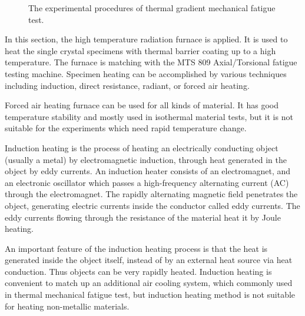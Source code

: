 \begin{figure}[!htp]
\caption{The experimental procedures of thermal gradient mechanical fatigue test.}
\label{Fig:tgmf_code}
\end{figure}

In this section, the high temperature radiation furnace is applied.
It is used to heat the single crystal specimens with thermal barrier coating up to a high temperature.
The furnace is matching with the MTS 809 Axial/Torsional fatigue testing machine.
Specimen heating can be accomplished by various techniques including induction, direct resistance, radiant, or forced air heating.




Forced air heating furnace can be used for all kinds of material. It has good temperature stability and mostly used in isothermal material tests, but it is not suitable for the experiments which need rapid temperature change.

Induction heating is the process of heating an electrically conducting object (usually a metal) by electromagnetic induction, through heat generated in the object by eddy currents. An induction heater consists of an electromagnet, and an electronic oscillator which passes a high-frequency alternating current (AC) through the electromagnet. The rapidly alternating magnetic field penetrates the object, generating electric currents inside the conductor called eddy currents. The eddy currents flowing through the resistance of the material heat it by Joule heating.

An important feature of the induction heating process is that the heat is generated inside the object itself, instead of by an external heat source via heat conduction. Thus objects can be very rapidly heated.
Induction heating is convenient to match up an additional air cooling system, which commonly used in thermal mechanical fatigue test, but induction heating method is not suitable for heating non-metallic materials.




